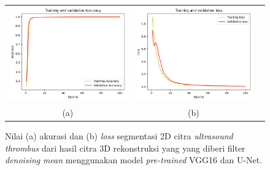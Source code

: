 \begin{enumerate}
	
	\begin{figure}[htbp]
		\centering
		\begin{tabular}{ccc}
			\includegraphics[scale=0.5]{bab4/Rekap Training/VGG16-UNet/mean/4/acc_99,74551796913147.png} &
			\includegraphics[scale=0.5]{bab4/Rekap Training/VGG16-UNet/mean/4/loss_0,0098.png} & \\
			(a) & (b)    %
		\end{tabular}
		\caption{Nilai (a) akurasi dan (b) \textit{loss} segmentasi 2D citra \textit{ultrasound} \textit{thrombus} dari hasil citra 3D rekonstruksi yang yang diberi filter \textit{denoising} \textit{mean} menggunakan model \textit{pre-trained} VGG16 dan U-Net.}
		\label{fig:performance-mean-vggunet-rekonstruksi}
	\end{figure}
	

\end{enumerate}
